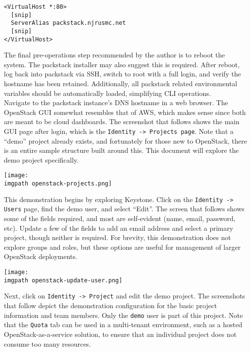 \begin{verbatim}
<VirtualHost *:80>
  [snip]
  ServerAlias packstack.njrusmc.net
  [snip]
</VirtualHost>
\end{verbatim}

The final pre-operations step recommended by the author is to reboot the
system. The packstack installer may also suggest this is required. After
reboot, log back into packstack via SSH, switch to root with a full login, and
verify the hostname has been retained. Additionally, all packstack related
environmental variables should be automatically loaded, simplifying CLI
operations. \\

Navigate to the packstack instance’s DNS hostname in a web browser. The
OpenStack GUI somewhat resembles that of AWS, which makes sense since both are
meant to be cloud dashboards. The screenshot that follows shows the main GUI
page after login, which is the \verb|Identity -> Projects page|. Note that a
``demo'' project already exists, and fortunately for those new to OpenStack,
there is an entire sample structure built around this. This document will
explore the demo project specifically.

    \begin{minipage}[t]{\linewidth}
	  \centering
      \texttt{[image: \\imgpath openstack-projects.png]}
    \end{minipage}

This demonstration begins by exploring Keystone. Click on the
\verb|Identity -> Users| page, find the demo user, and select ``Edit''. The
screen that follows shows some of the fields required, and most are
self-evident (name, email, password, etc). Update a few of the fields to add
an email address and select a primary project, though neither is required. For
brevity, this demonstration does not explore groups and roles, but these
options are useful for management of larger OpenStack deployments.

    \begin{minipage}[t]{\linewidth}
	  \centering
      \texttt{[image: \\imgpath openstack-update-user.png]}
    \end{minipage}

Next, click on \verb|Identity -> Project| and edit the demo project. The
screenshots that follow depict the demonstration configuration for
the basic project information and team members. Only the \verb|demo| user is
part of this project. Note that the \verb|Quota| tab can be used in a
multi-tenant environment, such as a hosted OpenStack-as-a-service solution, to
ensure that an individual project does not consume too many resources.

